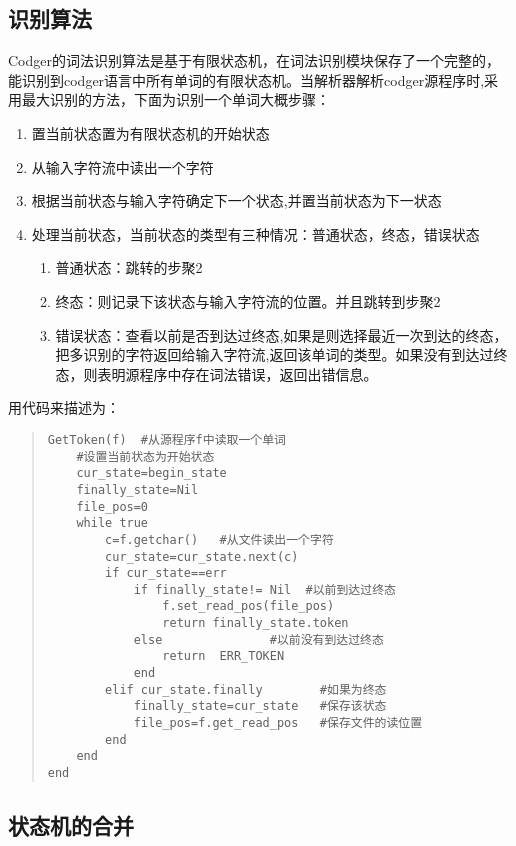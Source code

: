 \documentclass[a4paper,11pt]{article}
\begin{document}
\begin{CJK}{UTF8}{gbsn}
\subsection{识别算法}
Codger的词法识别算法是基于有限状态机，在词法识别模块保存了一个完整的，能识别到codger语言中所有单词的有限状态机。当解析器解析codger源程序时,采用最大识别的方法，下面为识别一个单词大概步骤：
\begin{enumerate}
 \item 置当前状态置为有限状态机的开始状态
 \item 从输入字符流中读出一个字符
 \item 根据当前状态与输入字符确定下一个状态,并置当前状态为下一状态
 \item 处理当前状态，当前状态的类型有三种情况：普通状态，终态，错误状态
 \begin{enumerate}
 	\item 普通状态：跳转的步聚2
 	\item 终态：则记录下该状态与输入字符流的位置。并且跳转到步聚2
 	\item 错误状态：查看以前是否到达过终态,如果是则选择最近一次到达的终态，把多识别的字符返回给输入字符流,返回该单词的类型。如果没有到达过终态，则表明源程序中存在词法错误，返回出错信息。
 \end{enumerate}
\end{enumerate}
用代码来描述为：
\begin{quote}
\begin{verbatim}
GetToken(f)  #从源程序f中读取一个单词
    #设置当前状态为开始状态
    cur_state=begin_state 
    finally_state=Nil
    file_pos=0   
    while true 
        c=f.getchar()   #从文件读出一个字符
        cur_state=cur_state.next(c)   
        if cur_state==err         
            if finally_state!= Nil  #以前到达过终态
                f.set_read_pos(file_pos)  
                return finally_state.token  
            else               #以前没有到达过终态
                return  ERR_TOKEN  
            end
        elif cur_state.finally        #如果为终态
            finally_state=cur_state   #保存该状态
            file_pos=f.get_read_pos   #保存文件的读位置
        end
    end
end 
\end{verbatim}
\end{quote}
    
\subsection{状态机的合并}







\end{CJK}
\end{document}
